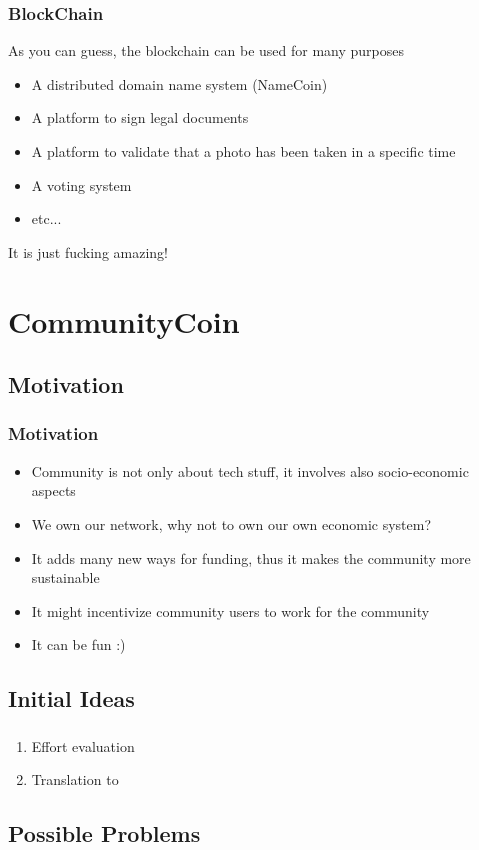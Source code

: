 \documentclass[usepdftitle=false,13pt]{beamer}
\begin{document}
\begin{frame}\frametitle{BlockChain}
	As you can guess, the blockchain can be used for many purposes
	\begin{itemize}
		\item A distributed domain name system (NameCoin)
		\item A platform to sign legal documents
		\item A platform to validate that a photo has been taken in a specific time
		\item A voting system
		\item etc...
	\end{itemize}
	It is just fucking amazing!
\end{frame}



\section{CommunityCoin}

\subsection{Motivation}

\begin{frame}\frametitle{Motivation}
	\begin{itemize}
		\item Community is not only about tech stuff, it involves also socio-economic aspects
		\item We own our network, why not to own our own economic system?
		\item It adds many new ways for funding, thus it makes the community more sustainable
		\item It might incentivize community users to work for the community
		\item It can be fun :)
	\end{itemize}
\end{frame}

\subsection{Initial Ideas}
\begin{frame}\frametitle{}
	\begin{enumerate}
		\item Effort evaluation
		\item Translation to 

	\end{enumerate}
\end{frame}

\subsection{Possible Problems}



\frame{\titlepage}
\end{document}
